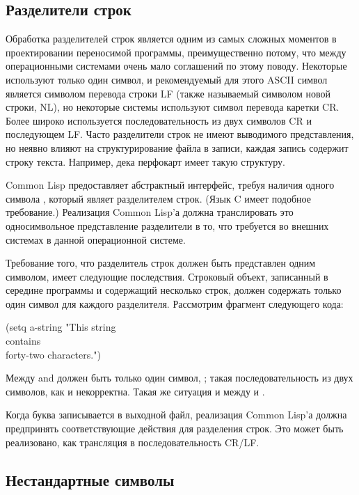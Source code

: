 \subsection{Разделители строк}

Обработка разделителей строк является одним из самых сложных моментов в
проектировании переносимой программы, преимущественно потому, что между
операционными системами очень мало соглашений по этому поводу. Некоторые
используют только один символ, и рекомендуемый для этого ASCII символ является
символом перевода строки LF (также называемый символом новой строки, NL),
но некоторые системы используют символ перевода каретки CR. Более
широко используется последовательность из двух символов CR и последующем
LF. Часто разделители строк не имеют выводимого представления, но неявно влияют
на структурирование файла в записи, каждая запись содержит строку
текста. Например, дека перфокарт имеет такую структуру.

Common Lisp предоставляет абстрактный интерфейс, требуя наличия одного символа
, который являет разделителем строк. (Язык C имеет
подобное требование.)
Реализация Common Lisp'а должна транслировать это односимвольное представление
разделители в то, что требуется во внешних системах в данной операционной системе.

Требование того, что разделитель строк должен быть представлен одним символом,
имеет следующие последствия. Строковый объект, записанный в середине программы и
содержащий несколько строк, должен содержать только один символ для каждого
разделителя. Рассмотрим фрагмент следующего кода:
\begin{lisp}
(setq a-string "This string \\
contains \\
forty-two characters.")
\end{lisp}

Между  and  должен быть только один символ,
; такая последовательность из двух
символов, как  и 
некорректна. Такая же ситуация и между  и .

Когда буква  записывается в выходной файл,
реализация Common Lisp'а должна предпринять соответствующие действия для
разделения строк. Это может быть реализовано, как трансляция
 в последовательность CR/LF.

\subsection{Нестандартные символы}

